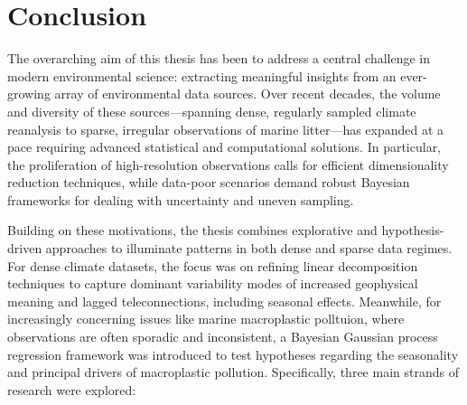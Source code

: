 \ifpdf
    \graphicspath{{content/chapter8/figs/raster/}{content/chapter8/figs/pdf/}{content/chapter8/figs/}}
\else
    \graphicspath{{content/chapter8/figs/vector/}{content/chapter8/figs/}}
\fi

\chapter{Conclusion}\label{chapter:conclusion}


The overarching aim of this thesis has been to address a central challenge in modern environmental science: extracting meaningful insights from an ever-growing array of environmental data sources. Over recent decades, the volume and diversity of these sources---spanning dense, regularly sampled climate reanalysis to sparse, irregular observations of marine litter---has expanded at a pace requiring advanced statistical and computational solutions. In particular, the proliferation of high-resolution observations calls for efficient dimensionality reduction techniques, while data-poor scenarios demand robust Bayesian frameworks for dealing with uncertainty and uneven sampling.

Building on these motivations, the thesis combines explorative and hypothesis-driven approaches to illuminate patterns in both dense and sparse data regimes. For dense climate datasets, the focus was on refining linear decomposition techniques to capture dominant variability modes of increased geophysical meaning and lagged teleconnections, including seasonal effects. Meanwhile, for increasingly concerning issues like marine macroplastic polltuion, where observations are often sporadic and inconsistent, a Bayesian Gaussian process regression framework was introduced to test hypotheses regarding the seasonality and principal drivers of macroplastic pollution. Specifically, three main strands of research were explored:


